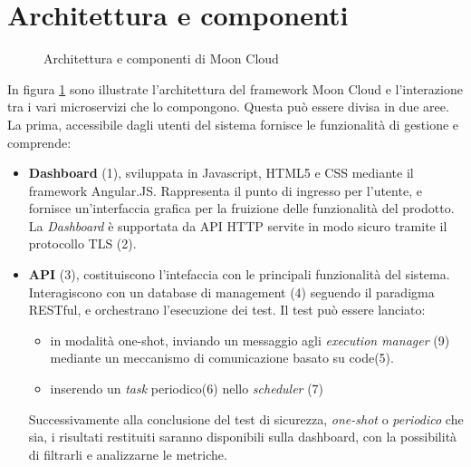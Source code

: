 \documentclass[../main.tex]{subfiles}
\begin{document}
\section{Architettura e componenti}
\begin{figure}[H]
\centering
{}
\caption{Architettura e componenti di Moon Cloud}\label{fig:MCArchi}
\end{figure}
In figura \ref{fig:MCArchi} sono illustrate l'architettura del framework Moon Cloud e l'interazione tra i vari microservizi che lo compongono.
Questa può essere divisa in due aree. La prima, accessibile dagli utenti del sistema fornisce le funzionalità di gestione e comprende:
\begin{itemize}
    \item \textbf{Dashboard} (1), sviluppata in Javascript, HTML5 e CSS mediante il framework Angular.JS. Rappresenta il punto di ingresso per l'utente, e fornisce un'interfaccia grafica per la fruizione delle funzionalità del prodotto. La \textit{Dashboard} è supportata da API HTTP servite in modo sicuro tramite il protocollo TLS (2).
    \item \textbf{API} (3), costituiscono l'intefaccia con le principali funzionalità del sistema. Interagiscono con un database di management (4) seguendo il paradigma RESTful, e orchestrano l'esecuzione dei test.
        Il test può essere lanciato:
        \begin{itemize}
            \item in modalità one-shot, inviando un messaggio agli \textit{execution manager} (9) mediante un meccanismo di comunicazione basato su code(5).
            \item inserendo un \textit{task} periodico(6) nello \textit{scheduler} (7)
        \end{itemize}
        Successivamente alla conclusione del test di sicurezza, \textit{one-shot} o \textit{periodico} che sia, i risultati restituiti saranno disponibili sulla dashboard, con la possibilità di filtrarli e analizzarne le metriche.
\end{itemize}
\end{document}
